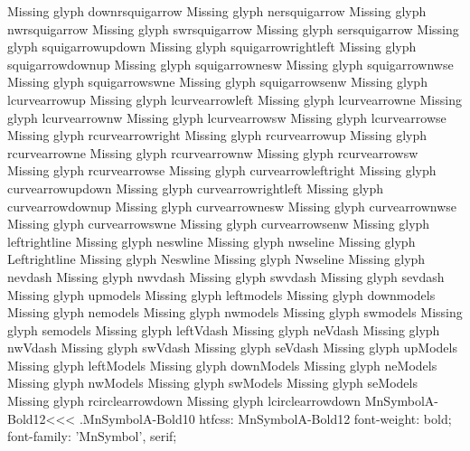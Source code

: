 Missing glyph	downrsquigarrow
Missing glyph	nersquigarrow
Missing glyph	nwrsquigarrow
Missing glyph	swrsquigarrow
Missing glyph	sersquigarrow
Missing glyph	squigarrowupdown
Missing glyph	squigarrowrightleft
Missing glyph	squigarrowdownup
Missing glyph	squigarrownesw
Missing glyph	squigarrownwse
Missing glyph	squigarrowswne
Missing glyph	squigarrowsenw
Missing glyph	lcurvearrowup
Missing glyph	lcurvearrowleft
Missing glyph	lcurvearrowne
Missing glyph	lcurvearrownw
Missing glyph	lcurvearrowsw
Missing glyph	lcurvearrowse
Missing glyph	rcurvearrowright
Missing glyph	rcurvearrowup
Missing glyph	rcurvearrowne
Missing glyph	rcurvearrownw
Missing glyph	rcurvearrowsw
Missing glyph	rcurvearrowse
Missing glyph	curvearrowleftright
Missing glyph	curvearrowupdown
Missing glyph	curvearrowrightleft
Missing glyph	curvearrowdownup
Missing glyph	curvearrownesw
Missing glyph	curvearrownwse
Missing glyph	curvearrowswne
Missing glyph	curvearrowsenw
Missing glyph	leftrightline
Missing glyph	neswline
Missing glyph	nwseline
Missing glyph	Leftrightline
Missing glyph	Neswline
Missing glyph	Nwseline
Missing glyph	nevdash
Missing glyph	nwvdash
Missing glyph	swvdash
Missing glyph	sevdash
Missing glyph	upmodels
Missing glyph	leftmodels
Missing glyph	downmodels
Missing glyph	nemodels
Missing glyph	nwmodels
Missing glyph	swmodels
Missing glyph	semodels
Missing glyph	leftVdash
Missing glyph	neVdash
Missing glyph	nwVdash
Missing glyph	swVdash
Missing glyph	seVdash
Missing glyph	upModels
Missing glyph	leftModels
Missing glyph	downModels
Missing glyph	neModels
Missing glyph	nwModels
Missing glyph	swModels
Missing glyph	seModels
Missing glyph	rcirclearrowdown
Missing glyph	lcirclearrowdown
\<MnSymbolA-Bold12\><<<
.MnSymbolA-Bold10
htfcss:  MnSymbolA-Bold12  font-weight: bold; font-family: 'MnSymbol', serif;

